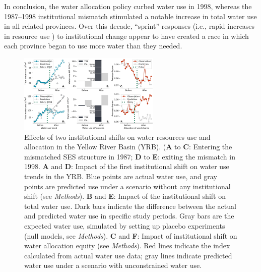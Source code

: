 \documentclass{nsr}
\begin{document}
In conclusion, the water allocation policy curbed water use in 1998, whereas the 1987–1998 institutional mismatch stimulated a notable increase in total water use in all related provinces.
Over this decade, “sprint” responses (i.e., rapid increases in resource use \cite{lueckPreemptiveHabitatDestruction2003}) to institutional change appear to have created a race in which each province began to use more water than they needed.


\begin{figure}
    \centering
    \includegraphics[width=16pc]{../../../figs/outputs/main_results.jpg}
    \caption{
        Effects of two institutional shifts on water resources use and allocation in the Yellow River Basin (YRB). (\textbf{A} to \textbf{C}: Entering the mismatched SES structure in 1987; \textbf{D} to \textbf{E}: exiting the mismatch in 1998. \textbf{A} and \textbf{D}: Impact of the first institutional shift on water use trends in the YRB. Blue points are actual water use, and gray points are predicted use under a scenario without any institutional shift (see \textit{Methods}). \textbf{B} and \textbf{E}: Impact of the institutional shift on total water use. Dark bars indicate the difference between the actual and predicted water use in specific study periods. Gray bars are the expected water use, simulated by setting up placebo experiments (null models, see \textit{Methods}). \textbf{C} and \textbf{F}: Impact of institutional shift on water allocation equity (see \textit{Methods}). Red lines indicate the index calculated from actual water use data; gray lines indicate predicted water use under a scenario with unconstrained water use.
    }
    \label{fig:main_results}
\end{figure}
\end{document}
